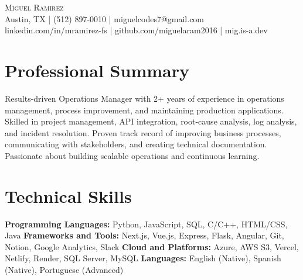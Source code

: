 \documentclass[letterpaper,10pt]{article}
\begin{document}
\begin{center}
  {\Large \scshape Miguel Ramirez} \\ \vspace{0pt}
  Austin, TX | (512) 897-0010 | miguelcodes7@gmail.com \\ 
  linkedin.com/in/mramirez-fs | github.com/miguelaram2016 | mig.is-a.dev
\end{center}

\section*{Professional Summary}
Results-driven Operations Manager with 2+ years of experience in operations management, process improvement, and maintaining production applications. Skilled in project management, API integration, root-cause analysis, log analysis, and incident resolution. Proven track record of improving business processes, communicating with stakeholders, and creating technical documentation. Passionate about building scalable operations and continuous learning.

\section*{Technical Skills}
\textbf{Programming Languages:} Python, JavaScript, SQL, C/C++, HTML/CSS, Java \newline
\textbf{Frameworks and Tools:} Next.js, Vue.js, Express, Flask, Angular, Git, Notion, Google Analytics, Slack \newline
\textbf{Cloud and Platforms:} Azure, AWS S3, Vercel, Netlify, Render, SQL Server, MySQL \newline
\textbf{Languages:} English (Native), Spanish (Native), Portuguese (Advanced)

\end{document}
